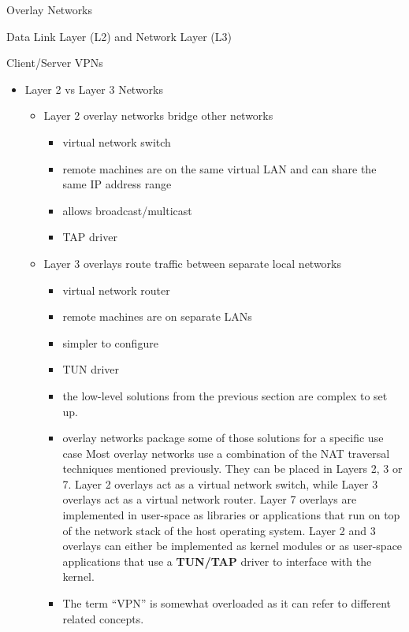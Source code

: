 \begin{block}{Overlay Networks}
\begin{block}{Data Link Layer (L2) and Network Layer (L3)}
\begin{block}{Client/Server VPNs}
\begin{itemize}
\tightlist
\item
  Layer 2 vs Layer 3 Networks

  \begin{itemize}
  \tightlist
  \item
    Layer 2 overlay networks bridge other networks

    \begin{itemize}
    \tightlist
    \item
      virtual network switch
    \item
      remote machines are on the same virtual LAN and can share the same IP address range
    \item
      allows broadcast/multicast
    \item
      TAP driver
    \end{itemize}
  \item
    Layer 3 overlays route traffic between separate local networks

    \begin{itemize}
    \item
      virtual network router
    \item
      remote machines are on separate LANs
    \item
      simpler to configure
    \item
      TUN driver
    \item
      the low-level solutions from the previous section are complex to set up.
    \item
      overlay networks package some of those solutions for a specific use case
      Most overlay networks use a combination of the NAT traversal techniques mentioned previously. They can be placed in Layers 2, 3 or 7. Layer 2 overlays act as a virtual network switch, while Layer 3 overlays act as a virtual network router. Layer 7 overlays are implemented in user-space as libraries or applications that run on top of the network stack of the host operating system. Layer 2 and 3 overlays can either be implemented as kernel modules or as user-space applications that use a \textbf{TUN/TAP}  driver to interface with the kernel.
    \end{itemize}


    \begin{itemize}
    \tightlist
    \item
      The term ``VPN'' is somewhat overloaded as it can refer to different related concepts.
    \end{itemize}


\end{itemize}
\end{itemize}
\end{block}
\end{block}
\end{block}
